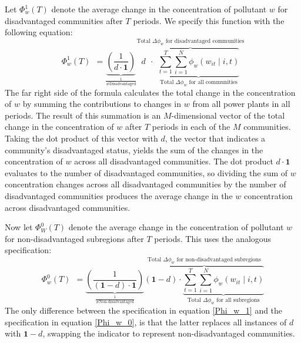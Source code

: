 Let $\Phi_w^1(T)$ denote the average change in the concentration of pollutant $w$ for disadvantaged communities after $T$ periods. We specify this function with the following equation:
    \begin{equation} \label{Phi_w_1}
        \Phi_w^1(T) ~~ = \underbrace{\left(\frac{1}{d \cdot \textbf{1}}\right)}_{\frac{1}{\text{\# Disadvantaged}}} \overbrace{d ~~ \cdot ~~\underbrace{\sum_{t = 1}^T \sum_{i=1}^N \phi_w(w_{it}\mid i, t)}_{\text{Total $\Delta \phi_w$ for all communities}}}^\text{Total $\Delta \phi_w$ for disadvantaged communities}
    \end{equation} 
The far right side of the formula calculates the total change in the concentration of $w$ by summing the contributions to changes in $w$ from all power plants in all periods. The result of this summation is an $M$-dimensional vector of the total change in the concentration of $w$ after $T$ periods in each of the $M$ communities. Taking the dot product of this vector with $d$, the vector that indicates a community's disadvantaged status, yields the sum of the changes in the concentration of $w$ across all disadvantaged communities. The dot product $d \cdot \textbf{1}$ evaluates to the number of disadvantaged communities, so dividing the sum of $w$ concentration changes across all disadvantaged communities by the number of disadvantaged communities produces the average change in the $w$ concentration across disadvantaged communities. 

Now let $\Phi_W^0(T)$ denote the average change in the concentration of pollutant $w$ for non-disadvantaged subregions after $T$ periods. This uses the analogous specification:
\begin{equation} \label{Phi_w_0}
    \Phi_w^0(T) ~~ = \underbrace{\left(\frac{1}{(\textbf{1} - d) \cdot \textbf{1}}\right)}_{\frac{1}{\text{\# Non-disadvantaged}}} \overbrace{\left(\textbf{1} - d\right) \cdot \underbrace{\sum_{t = 1}^T \sum_{i=1}^N \phi_w(w_{it}\mid i, t)}_{\text{Total $\Delta \phi_w$ for all subregions}} }^\text{Total $\Delta \phi_w$ for non-disadvantaged subregions}
\end{equation}
The only difference between the specification in equation \eqref{Phi_w_1} and the specification in equation \eqref{Phi_w_0}, is that the latter replaces all instances of $d$ with $\textbf{1} - d$, swapping the indicator to represent non-disadvantaged communities. 

